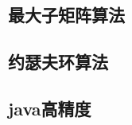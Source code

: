 \documentclass[UTF8]{ctexart}
\begin{document}
\begin{CJK}{UTF8}{<font>}
\begin{spacing}{0.80}
\subsection{最大子矩阵算法} 
\subsection{约瑟夫环算法} 
\subsection{java高精度} 
\end{spacing}
\end{CJK}
\end{document}
